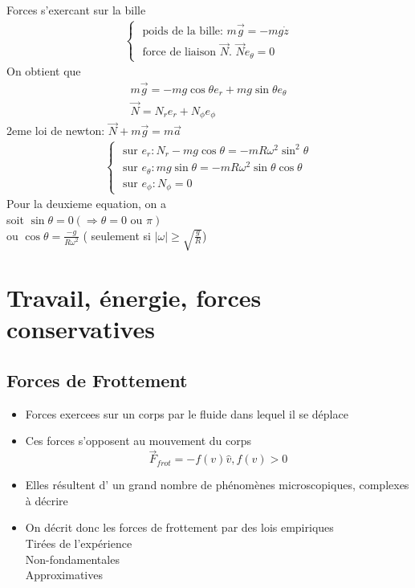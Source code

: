 \documentclass[../main.tex]{subfiles}
\begin{document}
Forces s'exercant sur la bille
\begin{align*}
\begin{cases}
\text{ poids de la bille: } m \vec{g} = - mg \dot z\\
\text{ force de liaison $\vec{N}$. } \vec{N} e_{\theta} =0
\end{cases}
\end{align*}
On obtient que
\begin{align*}
m \vec{g} = -mg \cos \theta e_{r} + mg \sin \theta e_{\theta} \\
\vec{N} = N_r e_r + N_{\phi} e_{\phi} 
\end{align*}
2eme loi de newton: $\vec{N} + m \vec{g} = m \vec{a}$ 
\begin{align*}
\begin{cases}
\text{ sur  } e_r : N_r -mg \cos \theta = -m R \omega  ^{2} \sin^{2} \theta\\
\text{ sur } e_{\theta} :mg \sin \theta = - mR \omega^{2}\sin \theta \cos \theta\\
\text{ sur } e_{\phi} : N_{\phi} =0
\end{cases}
\end{align*}
Pour la deuxieme equation, on a\\
soit $\sin \theta = 0 ( \Rightarrow \theta=0 \text{ ou } \pi)$\\
ou $\cos \theta = \frac{-g}{R \omega^{2}}$ ( seulement si $|\omega| \geq \sqrt{\frac{g}{R}}$)
\section{Travail, énergie, forces conservatives}
\subsection{Forces de Frottement}


\begin{itemize}
\item Forces exercees sur un corps par le fluide dans lequel il se déplace
\item Ces forces s'opposent au mouvement du corps
	\[ 
		\vec{F}_{frot} = -f(v) \hat{v}, f(v) > 0
	\]

\item Elles résultent d' un grand nombre de phénomènes microscopiques, complexes à décrire
\item On décrit donc les forces de frottement par des lois empiriques\\
	Tirées de l'expérience\\
	Non-fondamentales\\
	Approximatives
	
\end{itemize}
\end{document}
